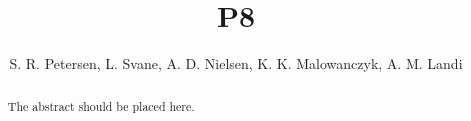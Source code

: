 \documentclass{llncs}
\begin{document}
\title{P8}


\author{S. R. Petersen, L. Svane, A. D. Nielsen, K. K. Malowanczyk, A. M. Landi%
}


\maketitle

\begin{abstract}
	The abstract should be placed here.
\end{abstract}








\end{document}
